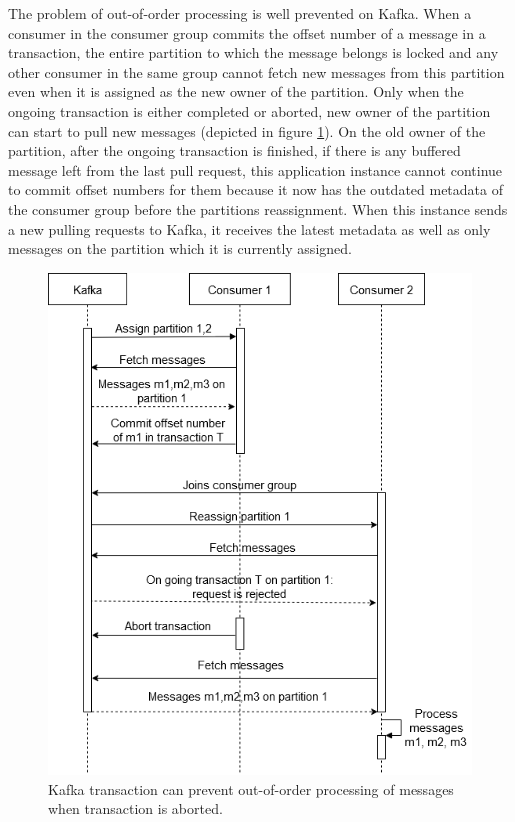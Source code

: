 The problem of out-of-order processing is well prevented on Kafka. When a consumer in the consumer group commits the offset number of a message in a transaction, the entire partition to which the message belongs is locked and any other consumer in the same group cannot fetch new messages from this partition even when it is assigned as the new owner of the partition. Only when the ongoing transaction is either completed or aborted, new owner of the partition can start to pull new messages (depicted in figure \ref{fig:kafkatransactionabort}). On the old owner of the partition, after the ongoing transaction is finished, if there is any buffered message left from the last pull request, this application instance cannot continue to commit offset numbers for them because it now has the outdated metadata of the consumer group before the partitions reassignment. When this instance sends a new pulling requests to Kafka, it receives the latest metadata as well as only messages on the partition which it is currently assigned.

\begin{figure}[h!]
	\centering
	\includegraphics[width=12cm]{images/kafka-transaction-abort.png}
	\caption{Kafka transaction can prevent out-of-order processing of messages when transaction is aborted.}
	\label{fig:kafkatransactionabort}
\end{figure}

